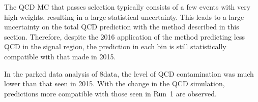 The QCD MC that passes selection typically consists of a few events
with very high weights, resulting in a large statistical
uncertainty. This leads to a large uncertainty on the total QCD
prediction with the method described in this section. Therefore,
despite the 2016 application of the method predicting less QCD in the
signal region,
the prediction in each bin is still statistically compatible with that  
made in 2015. 

In the parked data analysis of 8\tev data, the level of QCD
contamination was much lower than that seen
in 2015. With the change in the QCD simulation, predictions
more compatible with those seen in Run~1 are observed.

\begin{figure}[!h]
  \centering
   ~~ 
\end{figure}

